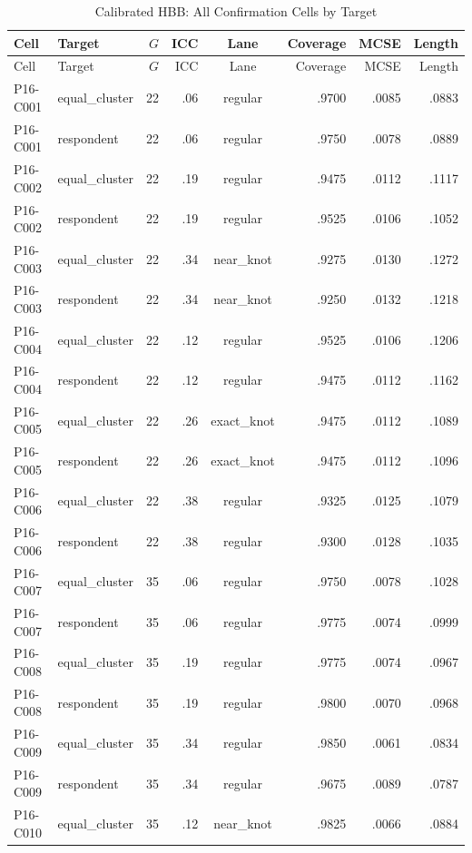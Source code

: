{\small
\setlength{\tabcolsep}{4.5pt}
\begin{longtable}{llrrcrrr}
\caption{Calibrated HBB: All Confirmation Cells by Target}
\label{tab:cellsF1} \\
\toprule
Cell & Target & $G$ & ICC & Lane & Coverage & MCSE & Length \\
\midrule
\endfirsthead
\toprule
Cell & Target & $G$ & ICC & Lane & Coverage & MCSE & Length \\
\midrule
\endhead
P16-C001 & equal\_cluster & 22 & .06 & regular & .9700 & .0085 & .0883 \\
P16-C001 & respondent & 22 & .06 & regular & .9750 & .0078 & .0889 \\
P16-C002 & equal\_cluster & 22 & .19 & regular & .9475 & .0112 & .1117 \\
P16-C002 & respondent & 22 & .19 & regular & .9525 & .0106 & .1052 \\
P16-C003 & equal\_cluster & 22 & .34 & near\_knot & .9275 & .0130 & .1272 \\
P16-C003 & respondent & 22 & .34 & near\_knot & .9250 & .0132 & .1218 \\
P16-C004 & equal\_cluster & 22 & .12 & regular & .9525 & .0106 & .1206 \\
P16-C004 & respondent & 22 & .12 & regular & .9475 & .0112 & .1162 \\
P16-C005 & equal\_cluster & 22 & .26 & exact\_knot & .9475 & .0112 & .1089 \\
P16-C005 & respondent & 22 & .26 & exact\_knot & .9475 & .0112 & .1096 \\
P16-C006 & equal\_cluster & 22 & .38 & regular & .9325 & .0125 & .1079 \\
P16-C006 & respondent & 22 & .38 & regular & .9300 & .0128 & .1035 \\
P16-C007 & equal\_cluster & 35 & .06 & regular & .9750 & .0078 & .1028 \\
P16-C007 & respondent & 35 & .06 & regular & .9775 & .0074 & .0999 \\
P16-C008 & equal\_cluster & 35 & .19 & regular & .9775 & .0074 & .0967 \\
P16-C008 & respondent & 35 & .19 & regular & .9800 & .0070 & .0968 \\
P16-C009 & equal\_cluster & 35 & .34 & regular & .9850 & .0061 & .0834 \\
P16-C009 & respondent & 35 & .34 & regular & .9675 & .0089 & .0787 \\
P16-C010 & equal\_cluster & 35 & .12 & near\_knot & .9825 & .0066 & .0884 \\

\end{longtable}}
